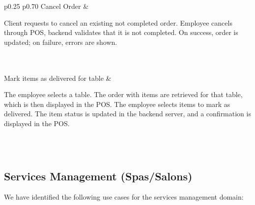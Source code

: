 \documentclass[]{VUMIFTemplateClass}
\begin{document}
\begin{longtable}{p{0.25\linewidth} p{0.70\linewidth}}
Cancel Order &
\begin{minipage}[t]{\linewidth}
Client requests to cancel an existing not completed order. Employee cancels through POS, backend validates that it is not completed. On success, order is updated; on failure, errors are shown.
\end{minipage} \\[6pt]
 \\[6pt]

Mark items as delivered for table &
\begin{minipage}[t]{\linewidth}
The employee selects a table. The order with items are retrieved for that table, which is then displayed in the POS. The employee selects items to mark as delivered. The item status is updated in the backend server, and a confirmation is displayed in the POS.
\end{minipage} \\[6pt]
 \\[6pt]

\end{longtable}



\subsection{Services Management (Spas/Salons)}

%


We have identified the following use cases for the services management domain:
\end{document}
